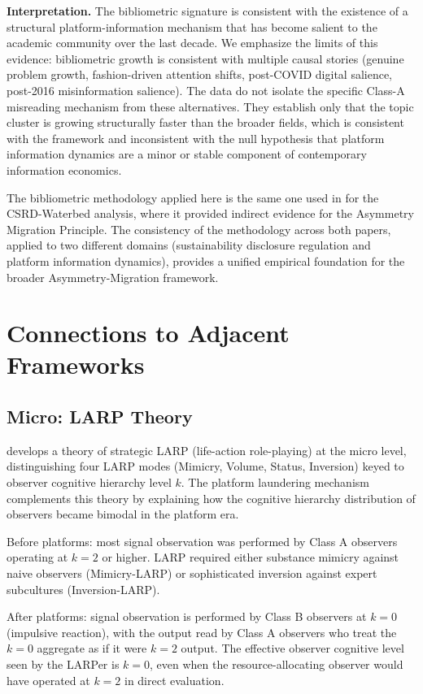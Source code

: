 \documentclass[11pt]{article}
\begin{document}
\medskip\noindent\textbf{Interpretation.} The bibliometric signature is consistent with the existence of a structural platform-information mechanism that has become salient to the academic community over the last decade. We emphasize the limits of this evidence: bibliometric growth is consistent with multiple causal stories (genuine problem growth, fashion-driven attention shifts, post-COVID digital salience, post-2016 misinformation salience). The data do not isolate the specific Class-A misreading mechanism from these alternatives. They establish only that the topic cluster is growing structurally faster than the broader fields, which is consistent with the framework and inconsistent with the null hypothesis that platform information dynamics are a minor or stable component of contemporary information economics.

\medskip\noindent The bibliometric methodology applied here is the same one used in \cite{vosteen2026waterbed} for the CSRD-Waterbed analysis, where it provided indirect evidence for the Asymmetry Migration Principle. The consistency of the methodology across both papers, applied to two different domains (sustainability disclosure regulation and platform information dynamics), provides a unified empirical foundation for the broader Asymmetry-Migration framework.

\section{Connections to Adjacent Frameworks}

\subsection{Micro: LARP Theory}

\cite{vosteen2026larp} develops a theory of strategic LARP (life-action role-playing) at the micro level, distinguishing four LARP modes (Mimicry, Volume, Status, Inversion) keyed to observer cognitive hierarchy level $k$. The platform laundering mechanism complements this theory by explaining how the cognitive hierarchy distribution of observers became bimodal in the platform era.

Before platforms: most signal observation was performed by Class A observers operating at $k = 2$ or higher. LARP required either substance mimicry against naive observers (Mimicry-LARP) or sophisticated inversion against expert subcultures (Inversion-LARP).

After platforms: signal observation is performed by Class B observers at $k = 0$ (impulsive reaction), with the output read by Class A observers who treat the $k = 0$ aggregate as if it were $k = 2$ output. The effective observer cognitive level seen by the LARPer is $k = 0$, even when the resource-allocating observer would have operated at $k = 2$ in direct evaluation.
\end{document}
